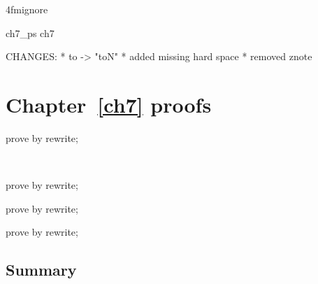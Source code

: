 \ai4fmignore{
\begin{zsection}
  \SECTION ch7\_ps \parents ch7
\end{zsection}
CHANGES:
* to -> "toN"
* added missing hard space
* removed znote
}
\chapter{Chapter~\ref{ch7} proofs}


\begin{LDCheck}\begin{zproof}
   prove by rewrite;
\end{zproof}~\end{LDCheck}

\begin{LDCheck}\begin{zproof}
   prove by rewrite;
\end{zproof}\end{LDCheck}

\begin{LDCheck}\begin{zproof}
   prove by rewrite;
\end{zproof}\end{LDCheck}

\begin{LDCheck}\begin{zproof}
   prove by rewrite;
\end{zproof}\end{LDCheck}


\newpage
\section{Summary}\label{ch7.ps.summary}
\lpscriptsummary
